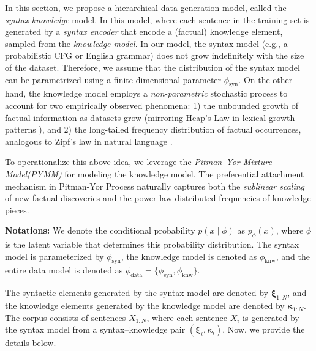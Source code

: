 \documentclass[11pt]{article}
\theoremstyle{plain}
\theoremstyle{definition}
\newcommand{\Voc}{\mathbb{V}}
\newcommand{\Vocsyn}{\mathbb{V}_{\text{syn}}}
\newcommand{\Vocknow}{\mathbb{V}_{\text{knw}}}
\newcommand{\dataModel}{\phi_{\text{data}}}
\newcommand{\knwModel}{\phi_{\text{knw}}}
\newcommand{\synModel}{\phi_{\text{syn}}}
\newcommand{\Knwelem}{\boldsymbol{\kappa}}
\newcommand{\Synelem}{\boldsymbol{\xi}}
\newcommand{\jian}[1]{{\it \color{red}{Jian: #1}}}
\begin{document}
In this section, we propose a hierarchical data generation model, called the {\em syntax-knowledge} model. In this model, where each sentence in the training set is generated by a {\em syntax encoder} that encode a (factual) knowledge element, sampled from the {\em knowledge model}. 
In our model, the syntax model (e.g., a probabilistic CFG or English grammar) does not grow indefinitely with the size of the dataset. Therefore, we assume that the distribution of the syntax model can be parametrized using a finite-dimensional parameter $\synModel$. On the other hand, the knowledge model employs a {\em non-parametric} stochastic process to account for two empirically observed phenomena: 1) the unbounded growth of factual information as datasets grow (mirroring Heap's Law in lexical growth patterns \citep{heaps1978information}), and 2) the long-tailed frequency distribution of factual occurrences, analogous to Zipf's law in natural language \citep{zipf2013psycho,zipf2016human}. 

To operationalize this above idea, we leverage the {\em Pitman–Yor Mixture Model(PYMM)} \citep{pitman1997two} for modeling the knowledge model. The preferential attachment mechanism 
in Pitman-Yor Process naturally captures both the {\em sublinear scaling} of new factual discoveries and 
the power-law distributed frequencies of knowledge pieces.

\vspace{0.1cm}
\noindent
{\bf Notations:} We denote the conditional probability \( p(x \mid \phi) \) as \( p_\phi(x) \), where \( \phi \) is the latent variable that determines this probability distribution.
The syntax model is parameterized by $\synModel$, the knowledge model is denoted as $\knwModel$, and the entire data model is denoted as 
$\dataModel=\{\synModel,\knwModel\}$. 


The syntactic elements generated by the syntax model are denoted by 
\( \Synelem_{1:N} \), and the knowledge elements generated by the knowledge model are denoted by \( \Knwelem_{1:N} \). 
The corpus consists of sentences \( X_{1:N} \), where each sentence \( X_i \) is generated by the syntax model from a syntax–knowledge pair \( (\Synelem_i, \Knwelem_i) \). 
Now, we provide the details below.
\end{document}

